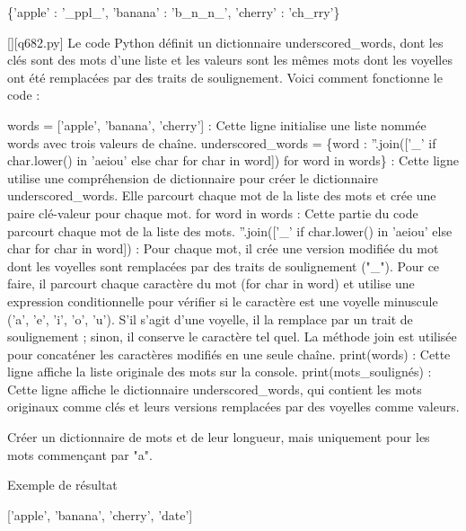 \{'apple' : '\_ppl\_', 'banana' : 'b\_n\_n\_', 'cherry' : 'ch\_rry'\}
        \par
        \begin{solution}
            \renewcommand{\nomfichier}{q682.py}
            \pythonfile{\chemincode \nomfichier}[][\nomfichier]
            Le code Python définit un dictionnaire underscored\_words, dont les clés sont des mots d'une liste et les valeurs sont les mêmes mots dont les voyelles ont été remplacées par des traits de soulignement. Voici comment fonctionne le code :

    words = ['apple', 'banana', 'cherry'] : Cette ligne initialise une liste nommée words avec trois valeurs de chaîne.
    underscored\_words = \{word : ''.join(['\_' if char.lower() in 'aeiou' else char for char in word]) for word in words\} : Cette ligne utilise une compréhension de dictionnaire pour créer le dictionnaire underscored\_words. Elle parcourt chaque mot de la liste des mots et crée une paire clé-valeur pour chaque mot.
        for word in words : Cette partie du code parcourt chaque mot de la liste des mots.
        ''.join(['\_' if char.lower() in 'aeiou' else char for char in word]) : Pour chaque mot, il crée une version modifiée du mot dont les voyelles sont remplacées par des traits de soulignement ("\_"). Pour ce faire, il parcourt chaque caractère du mot (for char in word) et utilise une expression conditionnelle pour vérifier si le caractère est une voyelle minuscule ('a', 'e', 'i', 'o', 'u'). S'il s'agit d'une voyelle, il la remplace par un trait de soulignement ; sinon, il conserve le caractère tel quel. La méthode join est utilisée pour concaténer les caractères modifiés en une seule chaîne.
    print(words) : Cette ligne affiche la liste originale des mots sur la console.
    print(mots\_soulignés) : Cette ligne affiche le dictionnaire underscored\_words, qui contient les mots originaux comme clés et leurs versions remplacées par des voyelles comme valeurs.
        \end{solution}
        

        \question
        Créer un dictionnaire de mots et de leur longueur, mais uniquement pour les mots commençant par "a".

Exemple de résultat

['apple', 'banana', 'cherry', 'date']

